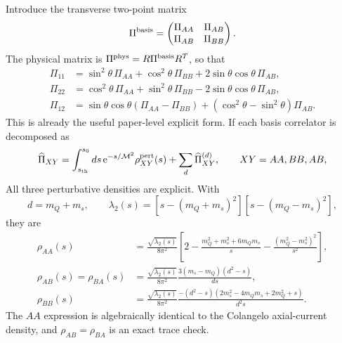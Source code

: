 \documentclass[11pt]{article}
\newcommand{\ee}{\mathrm{e}}
\begin{document}
Introduce the transverse two-point matrix
\begin{equation}
  \Pi^{\rm basis}=
  \begin{pmatrix}\Pi_{AA}&\Pi_{AB}\\\Pi_{AB}&\Pi_{BB}\end{pmatrix}.
\end{equation}
The physical matrix is
$\Pi^{\rm phys}=R\Pi^{\rm basis}R^T$, so that
\begin{align}
  \Pi_{11}
  &=\sin^2\theta\,\Pi_{AA}+\cos^2\theta\,\Pi_{BB}
    +2\sin\theta\cos\theta\,\Pi_{AB},
  \label{eq:pi11-mixed}\\
  \Pi_{22}
  &=\cos^2\theta\,\Pi_{AA}+\sin^2\theta\,\Pi_{BB}
    -2\sin\theta\cos\theta\,\Pi_{AB},
  \label{eq:pi22-mixed}\\
  \Pi_{12}
  &=\sin\theta\cos\theta(\Pi_{AA}-\Pi_{BB})
    +(\cos^2\theta-\sin^2\theta)\Pi_{AB}.
  \label{eq:pi12-mixed}
\end{align}
This is already the useful paper-level explicit form.  If each basis
correlator is decomposed as
\begin{equation}
  \widehat\Pi_{XY}=
  \int_{s_{\rm th}}^{s_0}ds\,\ee^{-s/\mathcal M^2}
  \rho_{XY}^{\rm pert}(s)
  +\sum_d\widehat\Pi_{XY}^{(d)},
  \qquad XY=AA,BB,AB,
  \label{eq:twopoint-basis-ope}
\end{equation}
All three perturbative densities are explicit.  With
\begin{equation}
 d=m_Q+m_s,\qquad
 \lambda_2(s)=[s-(m_Q+m_s)^2][s-(m_Q-m_s)^2],
\end{equation}
they are
\begin{align}
 \boxed{\rho_{AA}(s)}
 &=\frac{\sqrt{\lambda_2(s)}}{8\pi^2}
 \left[
 2-\frac{m_Q^2+m_s^2+6m_Qm_s}{s}
 -\frac{(m_Q^2-m_s^2)^2}{s^2}
 \right],
 \label{eq:rho-AA-explicit}\\
 \boxed{\rho_{AB}(s)=\rho_{BA}(s)}
 &=\frac{\sqrt{\lambda_2(s)}}{8\pi^2}
 \frac{3(m_s-m_Q)(d^2-s)}{ds},
 \label{eq:rho-AB-explicit}\\
 \boxed{\rho_{BB}(s)}
 &=\frac{\sqrt{\lambda_2(s)}}{8\pi^2}
 \frac{-(d^2-s)
 (2m_s^2-4m_Qm_s+2m_Q^2+s)}
 {d^2s}.
 \label{eq:rho-BB-explicit}
\end{align}
The $AA$ expression is algebraically identical to the Colangelo
axial-current density, and $\rho_{AB}=\rho_{BA}$ is an exact trace check.
\end{document}
